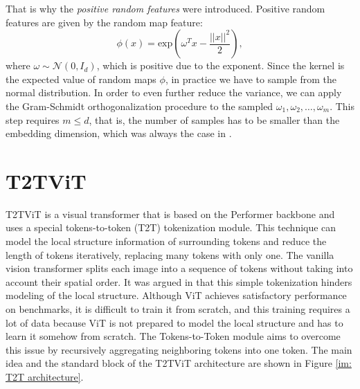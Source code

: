 \documentclass[en]{pracamgr}
\begin{document}
That is why the \textit{positive random features} were introduced. Positive random features are given by the random map feature:
\begin{equation*}
    \phi(x) = \textrm{exp}\left(\omega^T x-\frac{||x||^2}{2}\right),
\end{equation*}
where $\omega \sim \mathcal{N}(0, I_d)$, which is positive due to the exponent. Since the kernel is the expected value of random maps $\phi$, in practice we have to sample from the normal distribution. In order to even further reduce the variance, we can apply the Gram-Schmidt orthogonalization procedure to the sampled $\omega_1, \omega_2, \ldots, \omega_m$. This step requires $m\leq d$, that is, the number of samples has to be smaller than the embedding dimension, which was always the case in \cite{DBLP:conf/iclr/ChoromanskiLDSG21}.

\section{T2T\textunderscore ViT}\label{s:T2T}

T2T\textunderscore ViT \cite{DBLP:conf/iccv/0007CWYSJTFY21} is a visual transformer that is based on the Performer backbone and uses a special tokens-to-token (T2T) tokenization module. This technique can model the local structure information of surrounding tokens and reduce the length of tokens iteratively, replacing many tokens with only one. The vanilla vision transformer splits each image into a sequence of tokens without taking into account their spatial order. It was argued in \cite{DBLP:conf/iccv/0007CWYSJTFY21} that this simple tokenization hinders modeling of the local structure. Although ViT achieves satisfactory performance on benchmarks, it is difficult to train it from scratch, and this training requires a lot of data because ViT is not prepared to model the local structure and has to learn it somehow from scratch. The Tokens-to-Token module aims to overcome this issue by recursively aggregating neighboring tokens into one token. The main idea and the standard block of the T2T\textunderscore ViT architecture are shown in Figure \ref{im: T2T architecture}.
\end{document}

